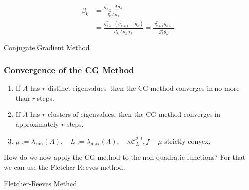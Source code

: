 \begin{align*}
    \beta_k &= \frac{g_{k+1}^T A d_k}{d_k^T A d_k} \\ 
    &= \frac{g_{k+1}^T (g_{k+1} - g_k)}{d_k^T A d_k \alpha_k} = \boxed{\frac{g_{k+1}^T g_{k+1}}{g_k^T g_k}}
\end{align*}

\begin{algorithm}
    \caption{Conjugate Gradient Method}
    \begin{algorithmic}[1]
        \EndIf
    \EndFor
    \end{algorithmic}
\end{algorithm}

\subsubsection{Convergence of the CG Method}

\begin{enumerate}
    \item If $A$ has $r$ distinct eigenvalues, then the CG method converges in no more than $r$ steps.
    \item If $A$ has $r$ clusters of eigenvalues, then the CG method converges in approximately $r$ steps.
    \item $\mu := \lambda_{\min}(A), \quad L := \lambda_{\max}(A), \quad \kappa \mathcal{C}_{L}^{2,1}, f - \mu$ strictly convex.
\end{enumerate}

How do we now apply the CG method to the non-quadratic functions? For that we can use the Fletcher-Reeves method.

\begin{algorithm}
    \caption{Fletcher-Reeves Method}
    \begin{algorithmic}[1]
        \EndIf
    \EndFor
    \end{algorithmic}
\end{algorithm}

